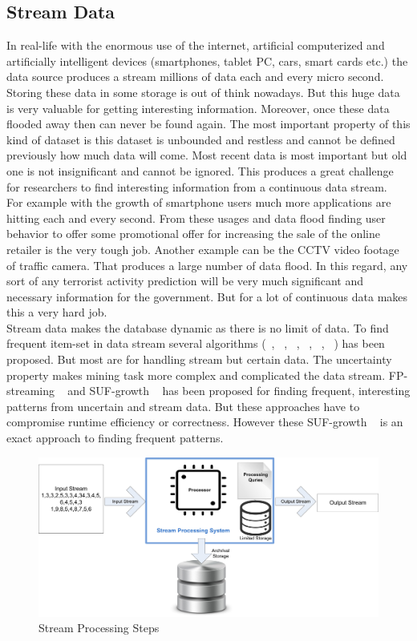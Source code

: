\subsection{Stream Data}
In real-life with the enormous use of the internet, artificial computerized and artificially intelligent devices (smartphones, tablet PC, cars, smart cards etc.) the data source produces a stream millions of data each and every micro second. Storing these data in some storage is out of think nowadays. But this huge data is very valuable for getting interesting information. Moreover, once these data flooded away then can never be found again. The most important property of this kind of dataset is this dataset is unbounded and restless and cannot be defined previously how much data will come. Most recent data is most important but old one is not insignificant and cannot be ignored. This produces a great challenge for researchers to find interesting information from a continuous data stream.\\
For example with the growth of smartphone users much more applications are hitting each and every second. From these usages and data flood finding user behavior to offer some promotional offer for increasing the sale of the online retailer is the very tough job. Another example can be the CCTV video footage of traffic camera. That produces a large number of data flood. In this regard, any sort of any terrorist activity prediction will be very much significant and necessary information for the government. But for a lot of continuous data makes this a very hard job.\\
Stream data makes the database dynamic as there is no limit of data. To find frequent item-set in data stream several algorithms (~\cite{uncertain_01}, ~\cite{uncertain_02}, ~\cite{uncertain_03}, ~\cite{uncertain_04}, ~\cite{uncertain_05}, ~\cite{uncertain_06}) has been proposed. But most are for handling stream but certain data. The uncertainty property makes mining task more complex and complicated the data stream. FP-streaming ~\cite{suf_growth} and SUF-growth ~\cite{suf_growth} has been proposed for finding frequent, interesting patterns from uncertain and stream data. But these approaches have to compromise runtime efficiency or correctness. However these SUF-growth ~\cite{suf_growth} is an exact approach to finding frequent patterns.
\begin{figure}
\centering
  \includegraphics[width=.9\textwidth]{images/stream_data.jpg}
\caption{Stream Processing Steps}
\label{figure:stream_data}
\end{figure}


